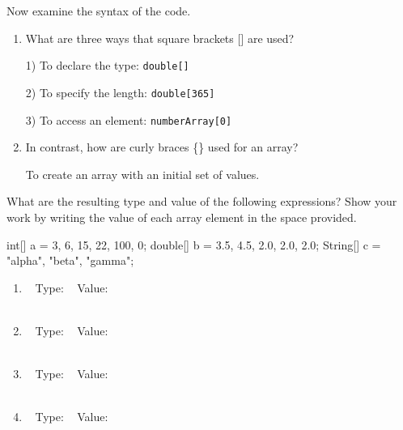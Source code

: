 \Q Now examine the syntax of the code.

\begin{enumerate}
\item What are three ways that square brackets [] are used?

\vspace{-1ex}
\begin{answer}[4em]
1) To declare the type: {\tt double[]}

2) To specify the length: {\tt double[365]}

3) To access an element: {\tt numberArray[0]}
\end{answer}

\item In contrast, how are curly braces \{\} used for an array?

\vspace{-1ex}
\begin{answer}[2em]
To create an array with an initial set of values.
\end{answer}
\end{enumerate}


\Q \label{typeval}
What are the resulting type and value of the following expressions?
Show your work by writing the value of each array element in the space provided.

\begin{javalst}
int[] a = {3, 6, 15, 22, 100, 0};
double[] b = {3.5, 4.5, 2.0, 2.0, 2.0};
String[] c = {"alpha", "beta", "gamma"};
\end{javalst}

\begin{enumerate}
\item {}
\hfill
~ Type:  
~ Value: 
\hspace{8em} \\
 ~~~ 

\item {}
\hfill
~ Type:  
~ Value: 
\hspace{8em} \\
 ~~~  ~~~ 

\item {}
\hfill
~ Type:  
~ Value: 
\hspace{8em} \\
 ~ ~ ~ ~ ~ ~ ~ 

\item {}
\hfill
~ Type:  
~ Value: 
\hspace{8em} \\
 ~~~  ~~ ~~~  ~~~ 

\end{enumerate}


